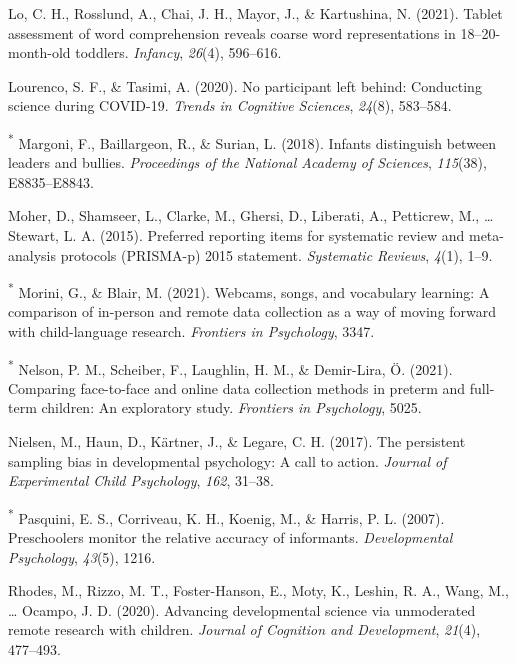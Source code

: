 \documentclass[
  man,floatsintext]{apa6}
\newlength{\cslhangindent}
\newlength{\cslentryspacingunit} %
\newenvironment{CSLReferences}[2] %
 {%
  \setlength{\parindent}{0pt}
  \ifodd #1
  \let\oldpar\par
  \def\par{\hangindent=\cslhangindent\oldpar}
  \fi
  \setlength{\parskip}{#2\cslentryspacingunit}
 }%
 {}
\begin{document}
\begin{CSLReferences}{1}{0}
\leavevmode{}%
Lo, C. H., Rosslund, A., Chai, J. H., Mayor, J., \& Kartushina, N. (2021). Tablet assessment of word comprehension reveals coarse word representations in 18--20-month-old toddlers. \emph{Infancy}, \emph{26}(4), 596--616.

\leavevmode{}%
Lourenco, S. F., \& Tasimi, A. (2020). No participant left behind: Conducting science during COVID-19. \emph{Trends in Cognitive Sciences}, \emph{24}(8), 583--584.

\leavevmode{}%
\textsuperscript{*} Margoni, F., Baillargeon, R., \& Surian, L. (2018). Infants distinguish between leaders and bullies. \emph{Proceedings of the National Academy of Sciences}, \emph{115}(38), E8835--E8843.

\leavevmode{}%
Moher, D., Shamseer, L., Clarke, M., Ghersi, D., Liberati, A., Petticrew, M., \ldots{} Stewart, L. A. (2015). Preferred reporting items for systematic review and meta-analysis protocols (PRISMA-p) 2015 statement. \emph{Systematic Reviews}, \emph{4}(1), 1--9.

\leavevmode{}%
\textsuperscript{*} Morini, G., \& Blair, M. (2021). Webcams, songs, and vocabulary learning: A comparison of in-person and remote data collection as a way of moving forward with child-language research. \emph{Frontiers in Psychology}, 3347.

\leavevmode{}%
\textsuperscript{*} Nelson, P. M., Scheiber, F., Laughlin, H. M., \& Demir-Lira, Ö. (2021). Comparing face-to-face and online data collection methods in preterm and full-term children: An exploratory study. \emph{Frontiers in Psychology}, 5025.

\leavevmode{}%
Nielsen, M., Haun, D., Kärtner, J., \& Legare, C. H. (2017). The persistent sampling bias in developmental psychology: A call to action. \emph{Journal of Experimental Child Psychology}, \emph{162}, 31--38.

\leavevmode{}%
\textsuperscript{*} Pasquini, E. S., Corriveau, K. H., Koenig, M., \& Harris, P. L. (2007). Preschoolers monitor the relative accuracy of informants. \emph{Developmental Psychology}, \emph{43}(5), 1216.

\leavevmode{}%
Rhodes, M., Rizzo, M. T., Foster-Hanson, E., Moty, K., Leshin, R. A., Wang, M., \ldots{} Ocampo, J. D. (2020). Advancing developmental science via unmoderated remote research with children. \emph{Journal of Cognition and Development}, \emph{21}(4), 477--493.


\end{CSLReferences}
\end{document}

